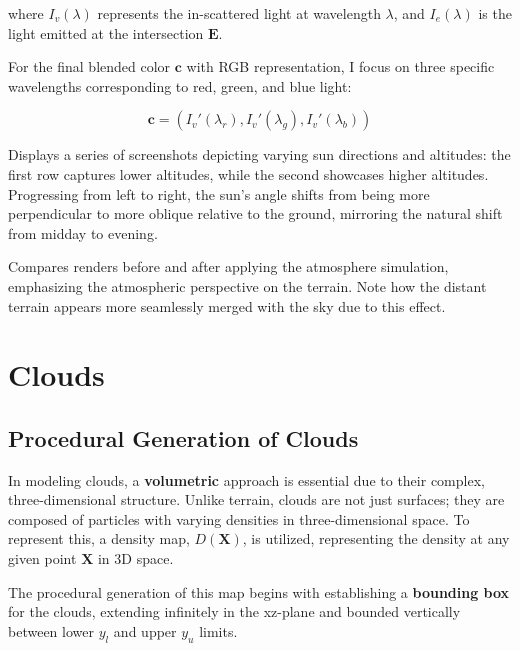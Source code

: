 where $I_v(\lambda)$ represents the in-scattered light at wavelength $\lambda$, and $I_e(\lambda)$ is the light emitted at the intersection $\mathbf{E}$. 

For the final blended color $\mathbf{c}$ with RGB representation, I focus on three specific wavelengths corresponding to red, green, and blue light:

\begin{equation}
\mathbf{c} = (I_{v}'(\lambda_r), I_{v}'(\lambda_g), I_{v}'(\lambda_b))
\end{equation}

{Displays a series of screenshots depicting varying sun directions and altitudes: the first row captures lower altitudes, while the second showcases higher altitudes. Progressing from left to right, the sun's angle shifts from being more perpendicular to more oblique relative to the ground, mirroring the natural shift from midday to evening.}

{Compares renders before and after applying the atmosphere simulation, emphasizing the atmospheric perspective on the terrain. Note how the distant terrain appears more seamlessly merged with the sky due to this effect.}

\section{Clouds}

\subsection{Procedural Generation of Clouds}

In modeling clouds, a \textbf{volumetric} approach is essential due to their complex, three-dimensional structure. Unlike terrain, clouds are not just surfaces; they are composed of particles with varying densities in three-dimensional space. To represent this, a density map, $D(\mathbf{X})$, is utilized, representing the density at any given point $\mathbf{X}$ in 3D space.

The procedural generation of this map begins with establishing a \textbf{bounding box} for the clouds, extending infinitely in the xz-plane and bounded vertically between lower $y_l$ and upper $y_u$ limits.

